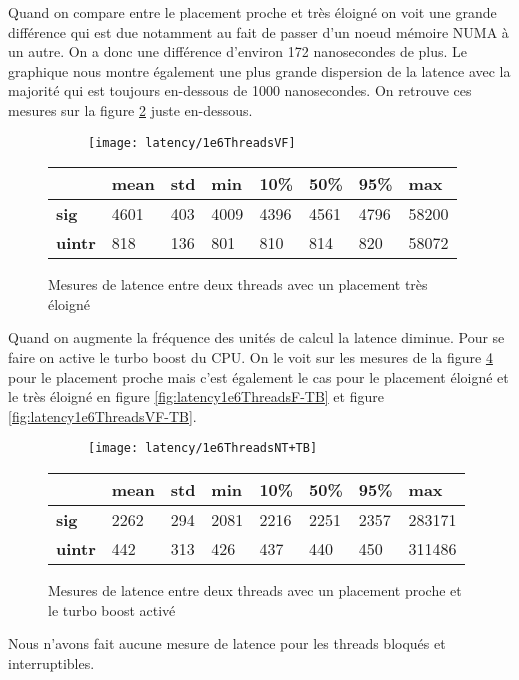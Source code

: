 Quand on compare entre le placement proche et très éloigné on voit une grande différence qui est due notamment au fait de passer d'un noeud mémoire NUMA à un autre.
On a donc une différence d'environ 172 nanosecondes de plus.
Le graphique nous montre également une plus grande dispersion de la latence avec la majorité qui est toujours en-dessous de 1000 nanosecondes.
On retrouve ces mesures sur la figure \ref{fig:latency1e6ThreadsVF} juste en-dessous.
\begin{figure}[H]
  \begin{subfigure}{\textwidth}
    \texttt{[image: latency/1e6ThreadsVF]}
    \caption{}
    \label{subfig:latency1e6ThreadsVF}
  \end{subfigure}
  \begin{subtable}{\textwidth}
    \centering
    \begin{tabular}{| l | l | l | l | l | l | l | l |}
      \hline
      &\bf mean &\bf std &\bf min  &\bf 10\% &\bf 50\% &\bf 95\% &\bf max\\
      \hline
      \bf sig   & 4601 & 403 & 4009 & 4396 & 4561 & 4796 & 58200\\
      \hline
      \bf uintr & 818  & 136 & 801  & 810  & 814  & 820  & 58072\\
      \hline
    \end{tabular}
    \caption{}
    \label{tab:latency1e6ThreadsVF}
  \end{subtable}
  \caption{Mesures de latence entre deux threads avec un placement très éloigné}
  \label{fig:latency1e6ThreadsVF}
\end{figure}

Quand on augmente la fréquence des unités de calcul la latence diminue.
Pour se faire on active le turbo boost du CPU.
On le voit sur les mesures de la figure \ref{fig:latency1e6ThreadsNT-TB} pour le placement proche mais c'est également le cas pour le placement éloigné et le très éloigné en figure \ref{fig:latency1e6ThreadsF-TB} et figure \ref{fig:latency1e6ThreadsVF-TB}.

\begin{figure}[H]
  \begin{subfigure}{\textwidth}
    \texttt{[image: latency/1e6ThreadsNT+TB]}
    \caption{}
    \label{subfig:latency1e6ThreadsNT-TB}
  \end{subfigure}
  \begin{subtable}{\textwidth}
    \centering
    \begin{tabular}{| l | l | l | l | l | l | l | l |}
      \hline
      &\bf mean &\bf std &\bf min  &\bf 10\% &\bf 50\% &\bf 95\% &\bf max\\
      \hline
      \bf sig   & 2262 & 294 & 2081 & 2216 & 2251 & 2357 & 283171\\
      \hline
      \bf uintr & 442  & 313 & 426  & 437  & 440  & 450  & 311486\\
      \hline
    \end{tabular}
    \caption{}
    \label{tab:latency1e6ThreadsNT-TB}
  \end{subtable}
  \caption{Mesures de latence entre deux threads avec un placement proche et le turbo boost activé}
  \label{fig:latency1e6ThreadsNT-TB}
\end{figure}

Nous n'avons fait aucune mesure de latence pour les threads bloqués et interruptibles.

